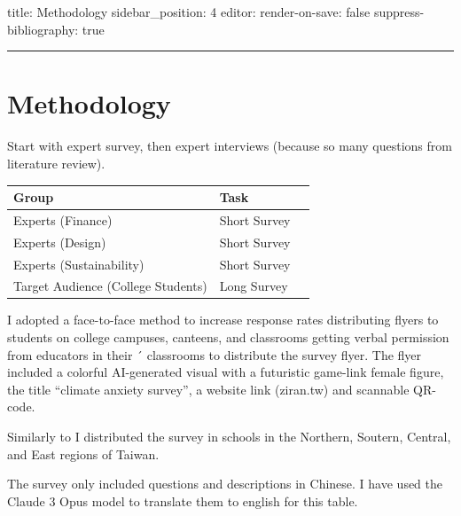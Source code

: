 \documentclass[
  letterpaper,
  DIV=11,
  numbers=noendperiod]{scrartcl}
\begin{document}
title: Methodology sidebar\_position: 4 editor: render-on-save: false
suppress-bibliography: true

\begin{center}\rule{0.5\linewidth}{0.5pt}\end{center}

\section{Methodology}\label{methodology}

Start with expert survey, then expert interviews (because so many
questions from literature review).

\begin{longtable}[]{@{}lll@{}}
\toprule\noalign{}
Group & Task & \\
\midrule\noalign{}
\endhead
\bottomrule\noalign{}
\endlastfoot
Experts (Finance) & Short Survey & \\
Experts (Design) & Short Survey & \\
Experts (Sustainability) & Short Survey & \\
Target Audience (College Students) & Long Survey & \\
\end{longtable}

I adopted a face-to-face method to increase response rates distributing
flyers to students on college campuses, canteens, and classrooms getting
verbal permission from educators in their ´ classrooms to distribute the
survey flyer. The flyer included a colorful AI-generated visual with a
futuristic game-link female figure, the title ``climate anxiety
survey'', a website link (ziran.tw) and scannable QR-code.

Similarly to \citep{liuDigitalCapabilityDigital2023} I distributed the
survey in schools in the Northern, Soutern, Central, and East regions of
Taiwan.

The survey only included questions and descriptions in Chinese. I have
used the Claude 3 Opus model to translate them to english for this
table.
\end{document}
